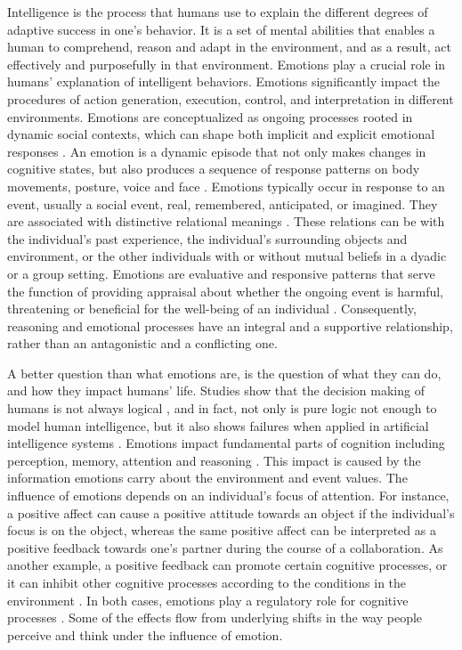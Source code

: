 \documentclass[12pt]{report}
\begin{document}
Intelligence is the process that humans use to explain the different degrees of
adaptive success in one's behavior. It is a set of mental abilities that enables
a human to comprehend, reason and adapt in the environment, and as a result, act
effectively and purposefully in that environment. Emotions play a crucial role
in humans' explanation of intelligent behaviors. Emotions significantly impact
the procedures of action generation, execution, control, and interpretation
\cite{zhu:emotion-action} in different environments. Emotions are conceptualized
as ongoing processes rooted in dynamic social contexts, which can shape both
implicit and explicit emotional responses
\cite{parkinson:emotion-social-interaction}. An emotion is a dynamic episode
that not only makes changes in cognitive states, but also produces a sequence of
response patterns on body movements, posture, voice and face
\cite{scherer:expression-appraisal}. Emotions typically occur in response to an
event, usually a social event, real, remembered, anticipated, or imagined. They
are associated with distinctive relational meanings
\cite{parkinson:holds-emotion}. These relations can be with the individual's
past experience, the individual's surrounding objects and environment, or the
other individuals with or without mutual beliefs in a dyadic or a group setting.
Emotions are evaluative and responsive patterns that serve the function of
providing appraisal about whether the ongoing event is harmful, threatening or
beneficial for the well-being of an individual \cite{zhu:emotion-action}.
Consequently, reasoning and emotional processes have an integral and a
supportive relationship, rather than an antagonistic and a conflicting one.

A better question than what emotions are, is the question of what they can
do, and how they impact humans' life. Studies show that the decision making of
humans is not always logical \cite{GrossbergGutowski:affect-cognition}, and in
fact, not only is pure logic not enough to model human intelligence, but it also
shows failures when applied in artificial intelligence systems
\cite{dreyfus:artificial-critique}. Emotions impact fundamental parts of
cognition including perception, memory, attention and reasoning
\cite{clore:judgement-regulation}. This impact is caused by the information
emotions carry about the environment and event values. The influence of emotions
depends on an individual's focus of attention. For instance, a positive affect
can cause a positive attitude towards an object if the individual's focus is on
the object, whereas the same positive affect can be interpreted as a positive
feedback towards one's partner during the course of a collaboration. As another
example, a positive feedback can promote certain cognitive processes, or it can
inhibit other cognitive processes according to the conditions in the environment
\cite{clore:affective-guidance}. In both cases, emotions play a regulatory role
for cognitive processes \cite{gross:emotion-generation-regulation}. Some of the
effects flow from underlying shifts in the way people perceive and think under
the influence of emotion.
\end{document}
